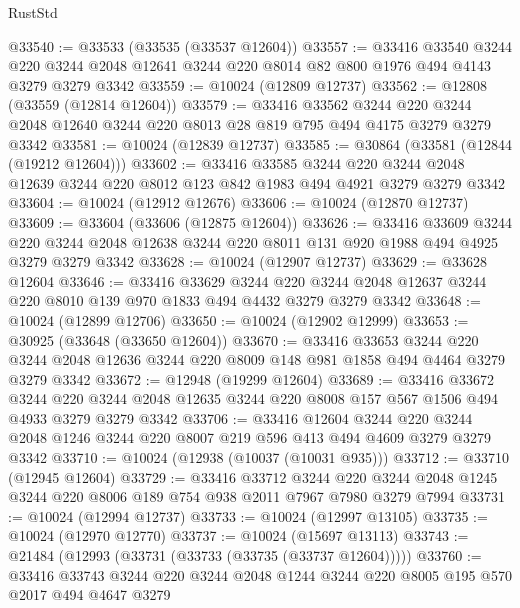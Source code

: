 \begin{lexlean}{RustStd}
\begin{coremodule}
@33540 := @33533 (@33535 (@33537 @12604))
@33557 := @33416
    @33540
    @3244
    @220
    @3244
    @2048
    @12641
    @3244
    @220
    @8014
    @82
    @800
    @1976
    @494
    @4143
    @3279
    @3279
    @3342
@33559 := @10024 (@12809 @12737)
@33562 := @12808 (@33559 (@12814 @12604))
@33579 := @33416
    @33562
    @3244
    @220
    @3244
    @2048
    @12640
    @3244
    @220
    @8013
    @28
    @819
    @795
    @494
    @4175
    @3279
    @3279
    @3342
@33581 := @10024 (@12839 @12737)
@33585 := @30864 (@33581 (@12844 (@19212 @12604)))
@33602 := @33416
    @33585
    @3244
    @220
    @3244
    @2048
    @12639
    @3244
    @220
    @8012
    @123
    @842
    @1983
    @494
    @4921
    @3279
    @3279
    @3342
@33604 := @10024 (@12912 @12676)
@33606 := @10024 (@12870 @12737)
@33609 := @33604 (@33606 (@12875 @12604))
@33626 := @33416
    @33609
    @3244
    @220
    @3244
    @2048
    @12638
    @3244
    @220
    @8011
    @131
    @920
    @1988
    @494
    @4925
    @3279
    @3279
    @3342
@33628 := @10024 (@12907 @12737)
@33629 := @33628 @12604
@33646 := @33416
    @33629
    @3244
    @220
    @3244
    @2048
    @12637
    @3244
    @220
    @8010
    @139
    @970
    @1833
    @494
    @4432
    @3279
    @3279
    @3342
@33648 := @10024 (@12899 @12706)
@33650 := @10024 (@12902 @12999)
@33653 := @30925 (@33648 (@33650 @12604))
@33670 := @33416
    @33653
    @3244
    @220
    @3244
    @2048
    @12636
    @3244
    @220
    @8009
    @148
    @981
    @1858
    @494
    @4464
    @3279
    @3279
    @3342
@33672 := @12948 (@19299 @12604)
@33689 := @33416
    @33672
    @3244
    @220
    @3244
    @2048
    @12635
    @3244
    @220
    @8008
    @157
    @567
    @1506
    @494
    @4933
    @3279
    @3279
    @3342
@33706 := @33416
    @12604
    @3244
    @220
    @3244
    @2048
    @1246
    @3244
    @220
    @8007
    @219
    @596
    @413
    @494
    @4609
    @3279
    @3279
    @3342
@33710 := @10024 (@12938 (@10037 (@10031 @935)))
@33712 := @33710 (@12945 @12604)
@33729 := @33416
    @33712
    @3244
    @220
    @3244
    @2048
    @1245
    @3244
    @220
    @8006
    @189
    @754
    @938
    @2011
    @7967
    @7980
    @3279
    @7994
@33731 := @10024 (@12994 @12737)
@33733 := @10024 (@12997 @13105)
@33735 := @10024 (@12970 @12770)
@33737 := @10024 (@15697 @13113)
@33743 := @21484 (@12993 (@33731 (@33733 (@33735 (@33737 @12604)))))
@33760 := @33416
    @33743
    @3244
    @220
    @3244
    @2048
    @1244
    @3244
    @220
    @8005
    @195
    @570
    @2017
    @494
    @4647
    @3279

\end{coremodule}
\end{lexlean}
